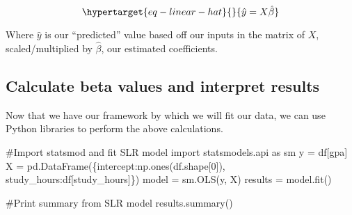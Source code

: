 \documentclass[
  letterpaper,
  DIV=11,
  numbers=noendperiod]{scrreprt}
\newenvironment{Shaded}{\begin{snugshade}}{\end{snugshade}}
\newcommand{\CommentTok}[1]{\textcolor[rgb]{0.37,0.37,0.37}{#1}}
\newcommand{\DecValTok}[1]{\textcolor[rgb]{0.68,0.00,0.00}{#1}}
\newcommand{\ImportTok}[1]{\textcolor[rgb]{0.00,0.46,0.62}{#1}}
\newcommand{\NormalTok}[1]{\textcolor[rgb]{0.00,0.23,0.31}{#1}}
\newcommand{\OperatorTok}[1]{\textcolor[rgb]{0.37,0.37,0.37}{#1}}
\newcommand{\StringTok}[1]{\textcolor[rgb]{0.13,0.47,0.30}{#1}}
\begin{document}
\begin{equation}\protect\hypertarget{eq-linear-hat}{}{
\hat{y} = X\hat{\beta}
}\label{eq-linear-hat}\end{equation}

Where \(\hat{y}\) is our ``predicted'' value based off our inputs in the
matrix of \(X\), scaled/multiplied by \(\hat{\beta}\), our estimated
coefficients.

\hypertarget{calculate-beta-values-and-interpret-results}{%
\subsection{Calculate beta values and interpret
results}\label{calculate-beta-values-and-interpret-results}}

Now that we have our framework by which we will fit our data, we can use
Python libraries to perform the above calculations.

\begin{Shaded}
\begin{Highlighting}[]
\CommentTok{\#Import statsmod and fit SLR model}
\ImportTok{import}\NormalTok{ statsmodels.api }\ImportTok{as}\NormalTok{ sm}
\NormalTok{y }\OperatorTok{=}\NormalTok{ df[}\StringTok{\textquotesingle{}gpa\textquotesingle{}}\NormalTok{]}
\NormalTok{X }\OperatorTok{=}\NormalTok{ pd.DataFrame(\{}\StringTok{\textquotesingle{}intercept\textquotesingle{}}\NormalTok{:np.ones(df.shape[}\DecValTok{0}\NormalTok{]), }\StringTok{\textquotesingle{}study\_hours\textquotesingle{}}\NormalTok{:df[}\StringTok{\textquotesingle{}study\_hours\textquotesingle{}}\NormalTok{]\})}
\NormalTok{model }\OperatorTok{=}\NormalTok{ sm.OLS(y, X)}
\NormalTok{results }\OperatorTok{=}\NormalTok{ model.fit()}
\end{Highlighting}
\end{Shaded}

\begin{Shaded}
\begin{Highlighting}[]
\CommentTok{\#Print summary from SLR model}
\NormalTok{results.summary()}
\end{Highlighting}
\end{Shaded}
\end{document}
